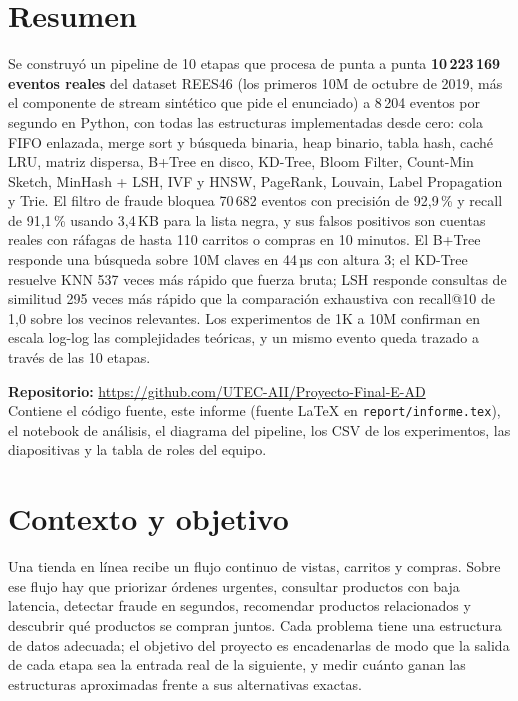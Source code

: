 \documentclass[11pt,letterpaper]{article}
\newcommand{\repo}{https://github.com/UTEC-AII/Proyecto-Final-E-AD}
\begin{document}
\tableofcontents
\newpage

\section*{Resumen}

Se construyó un pipeline de 10 etapas que procesa de punta a punta \textbf{10\,223\,169 eventos reales} del dataset REES46 (los primeros 10M de octubre de 2019, más el componente de stream sintético que pide el enunciado) a 8\,204 eventos por segundo en Python, con todas las estructuras implementadas desde cero: cola FIFO enlazada, merge sort y búsqueda binaria, heap binario, tabla hash, caché LRU, matriz dispersa, B+Tree en disco, KD-Tree, Bloom Filter, Count-Min Sketch, MinHash + LSH, IVF y HNSW, PageRank, Louvain, Label Propagation y Trie. El filtro de fraude bloquea 70\,682 eventos con precisión de 92{,}9\,\% y recall de 91{,}1\,\% usando 3{,}4\,KB para la lista negra, y sus falsos positivos son cuentas reales con ráfagas de hasta 110 carritos o compras en 10 minutos. El B+Tree responde una búsqueda sobre 10M claves en 44\,µs con altura 3; el KD-Tree resuelve KNN 537 veces más rápido que fuerza bruta; LSH responde consultas de similitud 295 veces más rápido que la comparación exhaustiva con recall@10 de 1{,}0 sobre los vecinos relevantes. Los experimentos de 1K a 10M confirman en escala log-log las complejidades teóricas, y un mismo evento queda trazado a través de las 10 etapas.

\textbf{Repositorio:} \url{\repo}\\
Contiene el código fuente, este informe (fuente \LaTeX{} en \texttt{report/informe.tex}), el notebook de análisis, el diagrama del pipeline, los CSV de los experimentos, las diapositivas y la tabla de roles del equipo.

\section{Contexto y objetivo}

Una tienda en línea recibe un flujo continuo de vistas, carritos y compras. Sobre ese flujo hay que priorizar órdenes urgentes, consultar productos con baja latencia, detectar fraude en segundos, recomendar productos relacionados y descubrir qué productos se compran juntos. Cada problema tiene una estructura de datos adecuada; el objetivo del proyecto es encadenarlas de modo que la salida de cada etapa sea la entrada real de la siguiente, y medir cuánto ganan las estructuras aproximadas frente a sus alternativas exactas.
\end{document}

